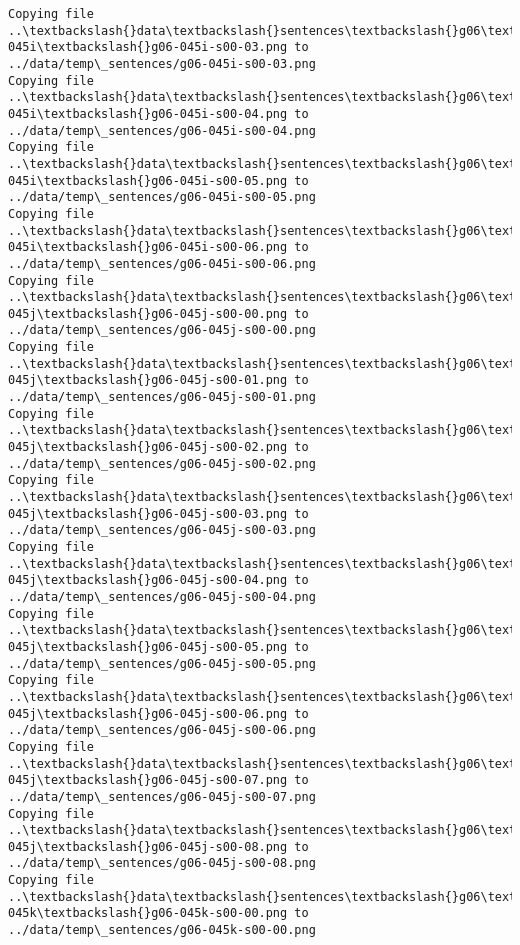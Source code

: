 \documentclass[11pt]{article}
\begin{document}
\begin{Verbatim}[commandchars=\\\{\}]
Copying file ..\textbackslash{}data\textbackslash{}sentences\textbackslash{}g06\textbackslash{}g06-045i\textbackslash{}g06-045i-s00-03.png to
../data/temp\_sentences/g06-045i-s00-03.png
Copying file ..\textbackslash{}data\textbackslash{}sentences\textbackslash{}g06\textbackslash{}g06-045i\textbackslash{}g06-045i-s00-04.png to
../data/temp\_sentences/g06-045i-s00-04.png
Copying file ..\textbackslash{}data\textbackslash{}sentences\textbackslash{}g06\textbackslash{}g06-045i\textbackslash{}g06-045i-s00-05.png to
../data/temp\_sentences/g06-045i-s00-05.png
Copying file ..\textbackslash{}data\textbackslash{}sentences\textbackslash{}g06\textbackslash{}g06-045i\textbackslash{}g06-045i-s00-06.png to
../data/temp\_sentences/g06-045i-s00-06.png
Copying file ..\textbackslash{}data\textbackslash{}sentences\textbackslash{}g06\textbackslash{}g06-045j\textbackslash{}g06-045j-s00-00.png to
../data/temp\_sentences/g06-045j-s00-00.png
Copying file ..\textbackslash{}data\textbackslash{}sentences\textbackslash{}g06\textbackslash{}g06-045j\textbackslash{}g06-045j-s00-01.png to
../data/temp\_sentences/g06-045j-s00-01.png
Copying file ..\textbackslash{}data\textbackslash{}sentences\textbackslash{}g06\textbackslash{}g06-045j\textbackslash{}g06-045j-s00-02.png to
../data/temp\_sentences/g06-045j-s00-02.png
Copying file ..\textbackslash{}data\textbackslash{}sentences\textbackslash{}g06\textbackslash{}g06-045j\textbackslash{}g06-045j-s00-03.png to
../data/temp\_sentences/g06-045j-s00-03.png
Copying file ..\textbackslash{}data\textbackslash{}sentences\textbackslash{}g06\textbackslash{}g06-045j\textbackslash{}g06-045j-s00-04.png to
../data/temp\_sentences/g06-045j-s00-04.png
Copying file ..\textbackslash{}data\textbackslash{}sentences\textbackslash{}g06\textbackslash{}g06-045j\textbackslash{}g06-045j-s00-05.png to
../data/temp\_sentences/g06-045j-s00-05.png
Copying file ..\textbackslash{}data\textbackslash{}sentences\textbackslash{}g06\textbackslash{}g06-045j\textbackslash{}g06-045j-s00-06.png to
../data/temp\_sentences/g06-045j-s00-06.png
Copying file ..\textbackslash{}data\textbackslash{}sentences\textbackslash{}g06\textbackslash{}g06-045j\textbackslash{}g06-045j-s00-07.png to
../data/temp\_sentences/g06-045j-s00-07.png
Copying file ..\textbackslash{}data\textbackslash{}sentences\textbackslash{}g06\textbackslash{}g06-045j\textbackslash{}g06-045j-s00-08.png to
../data/temp\_sentences/g06-045j-s00-08.png
Copying file ..\textbackslash{}data\textbackslash{}sentences\textbackslash{}g06\textbackslash{}g06-045k\textbackslash{}g06-045k-s00-00.png to
../data/temp\_sentences/g06-045k-s00-00.png

\end{Verbatim}
\end{document}
